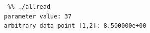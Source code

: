 
\begin{verbatim}
 %% ./allread
parameter value: 37
arbitrary data point [1,2]: 8.500000e+00
\end{verbatim}

